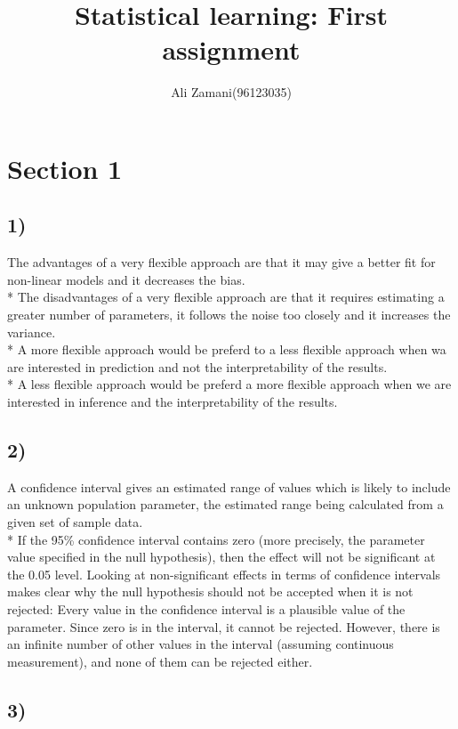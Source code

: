 \documentclass[12pt]{article}
\title{
	{\large Statistical learning: First assignment}\\}
\author{Ali Zamani(96123035)}
\begin{document}
\maketitle

\newpage

\section{Section 1}
\subsection{1)}
The advantages of a very flexible approach are that it may give a better fit for non-linear models and it decreases the bias.\\*
The disadvantages of a very flexible approach are that it requires estimating a greater number of parameters, it follows the noise too closely and it increases the variance.\\*
A more flexible approach would be preferd to a less flexible approach when wa are interested in prediction and not the interpretability of the results.\\*
A less flexible approach would be preferd a more flexible approach when we are interested in inference and the interpretability of the results.
\subsection{2)}
A confidence interval gives an estimated range of values which is likely to include an unknown population parameter, the estimated range being calculated from a given set of sample data. \\*
If the 95\% confidence interval contains zero (more precisely, the parameter value specified in the null hypothesis), then the effect will not be significant at the 0.05 level. Looking at non-significant effects in terms of confidence intervals makes clear why the null hypothesis should not be accepted when it is not rejected: Every value in the confidence interval is a plausible value of the parameter. Since zero is in the interval, it cannot be rejected. However, there is an infinite number of other values in the interval (assuming continuous measurement), and none of them can be rejected either.
\subsection{3)}
\end{document}
